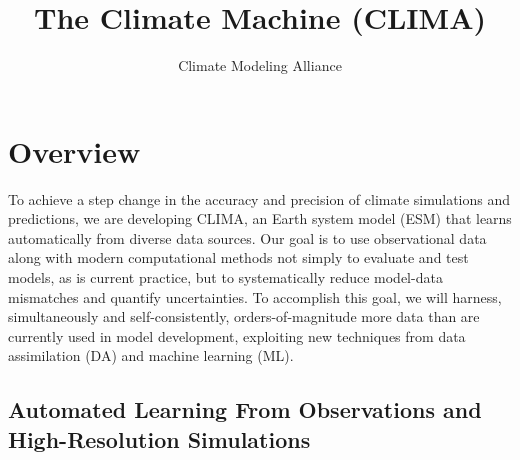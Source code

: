 \documentclass{article}
\title{The Climate Machine (CLIMA)}
\author{Climate Modeling Alliance}
\begin{document}
\maketitle
\tableofcontents

\section{Overview}

To achieve a step change in the accuracy and precision of climate simulations and predictions, we are developing CLIMA, an Earth system model (ESM) that learns automatically from diverse data sources. Our goal is to use observational data along with modern computational methods not simply to evaluate and test models, as is current practice, but to systematically reduce model-data mismatches and quantify uncertainties. To accomplish this goal, we will harness, simultaneously and self-consistently, orders-of-magnitude more data than are currently used in model development, exploiting new techniques from data assimilation (DA) and machine learning (ML).

\subsection{Automated Learning From Observations and High-Resolution Simulations}
\end{document}
